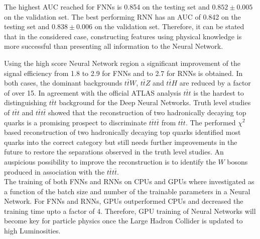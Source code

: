 The highest AUC reached for FNNs is 0.854 on the testing set and $0.852 \pm 0.005$ on the validation set. The best performing RNN has an AUC of 0.842 on the testing set and $0.838 \pm 0.006$ on the validation set. Therefore, it can be stated that in the considered case, constructing features using physical knowledge is more successful than presenting all information to the Neural Network.

\newpage

Using the high score Neural Network region a significant improvement of the signal efficiency from 1.8 to 2.9 for FNNs and to 2.7 for RNNs is obtained. In both cases, the dominant backgrounds $t\bar{t}W$, $t\bar{t}Z$ and $t\bar{t}H$ are reduced by a factor of over 15. In agreement with the official ATLAS analysis $t\bar{t}t$ is the hardest to distinguishing $t\bar{t}t$ background for the Deep Neural Networks.
Truth level studies of $t\bar{t}t$ and $t\bar{t}t\bar{t}$ showed that the reconstruction of two hadronically decaying top quarks is a promising prospect to discriminate $t\bar{t}t\bar{t}$ from $t\bar{t}t$. The performed $\chi^2$ based reconstruction of two hadronically decaying top quarks identified most quarks into the correct category but still needs further improvements in the future to restore the separations observed in the truth level studies. An auspicious possibility to improve the reconstruction is to identify the $W$ bosons produced in association with the $t\bar{t}t\bar{t}$. \\
The training of both FNNs and RNNs on CPUs and GPUs where investigated as a function of the batch size and number of the trainable parameters in a Neural Network. For FNNs and RNNs, GPUs outperformed CPUs and decreased the training time upto a factor of 4. Therefore, GPU training of Neural Networks will become key for particle physics once the Large Hadron Collider is updated to high Luminosities.